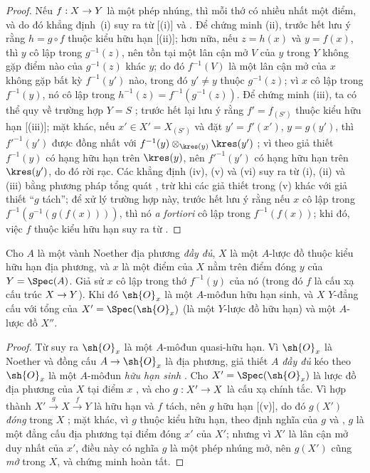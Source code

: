 \documentclass[oneside,10pt]{amsart}
\makeatletter
\newcommand{\ega@arrow}[2]{\mathchoice{#1}{#2}{#2}{#2}}
\renewcommand{\to}{\ega@arrow{\longrightarrow}{\rightarrow}}
\newcommand{\oldpage}[2][]{\marginnote{\normalfont\footnotesize\textbf{#1}~|~#2}\ignorespaces}
\let\EGAOriginalLabel\label
\renewcommand{\label}[1]{\phantomsection\EGAOriginalLabel{#1}}
\makeatother
\begin{document}
\begin{proof}
Nếu $f:X\to Y$ là một phép nhúng, thì mỗi thớ có nhiều nhất một điểm, và do đó khẳng định~(i) suy ra từ [(i)] và .
Để chứng minh (ii), trước hết lưu ý rằng $h=g\circ f$ thuộc kiểu hữu hạn [(ii)];
hơn nữa, nếu $z=h(x)$ và $y=f(x)$, thì $y$ cô lập trong $g^{-1}(z)$, nên tồn tại một lân cận mở $V$ của $y$ trong $Y$ không gặp điểm nào của $g^{-1}(z)$ khác $y$;
do đó $f^{-1}(V)$ là một lân cận mở của $x$ không gặp bất kỳ
\oldpage[II]{116}
$f^{-1}(y')$ nào, trong đó $y'\neq y$ thuộc $g^{-1}(z)$;
vì $x$ cô lập trong $f^{-1}(y)$, nó cô lập trong $h^{-1}(z)=f^{-1}(g^{-1}(z))$.
Để chứng minh (iii), ta có thể quy về trường hợp $Y=S$ ;
trước hết lại lưu ý rằng $f'=f_{(S')}$ thuộc kiểu hữu hạn [(iii)];
mặt khác, nếu $x'\in X'=X_{(S')}$ và đặt $y'=f'(x')$, $y=g(y')$, thì ${f'}^{-1}(y')$ được đồng nhất với $f^{-1}(y)\otimes_{\kres(y)}\kres(y')$ ;
vì theo giả thiết $f^{-1}(y)$ có hạng hữu hạn trên $\kres(y)$, nên ${f'}^{-1}(y')$ có hạng hữu hạn trên $\kres(y')$, do đó rời rạc.
Các khẳng định (iv), (v) và (vi) suy ra từ (i), (ii) và (iii) bằng phương pháp tổng quát , trừ khi các giả thiết trong (v) khác với giả thiết ``$g$ tách'';
để xử lý trường hợp này, trước hết lưu ý rằng nếu $x$ cô lập trong $f^{-1}(g^{-1}(g(f(x))))$, thì nó \emph{a fortiori} cô lập trong $f^{-1}(f(x))$;
khi đó, việc $f$ thuộc kiểu hữu hạn suy ra từ .
\end{proof}

\begin{proposition}[6.2.5]
\label{II.6.2.5}
Cho $A$ là một vành Noether địa phương \emph{đầy đủ}, $X$ là một $A$-lược đồ thuộc kiểu hữu hạn địa phương, và $x$ là một điểm của $X$ nằm trên điểm đóng $y$ của $Y=\Spec(A)$.
Giả sử $x$ cô lập trong thớ $f^{-1}(y)$ của nó (trong đó $f$ là cấu xạ cấu trúc $X\to Y$).
Khi đó $\sh{O}_x$ là một $A$-môđun hữu hạn sinh, và $X$ $Y$-đẳng cấu với tổng  của $X'=\Spec(\sh{O}_x)$ (là một $Y$-lược đồ hữu hạn) và một $A$-lược đồ $X''$.
\end{proposition}

\begin{proof}
Từ  suy ra $\sh{O}_x$ là một $A$-môđun quasi-hữu hạn.
Vì $\sh{O}_x$ là Noether  và đồng cấu $A\to\sh{O}_x$ là địa phương, giả thiết $A$ \emph{đầy đủ} kéo theo $\sh{O}_x$ là một $A$-môđun \emph{hữu hạn sinh} .
Cho $X'=\Spec(\sh{O}_x)$ là lược đồ địa phương của $X$ tại điểm $x$ , và cho $g:X'\to X$ là cấu xạ chính tắc.
Vì hợp thành $X'\xrightarrow{g}X\xrightarrow{f}Y$ là hữu hạn  và $f$ tách, nên $g$ hữu hạn [(v)], do đó $g(X')$ \emph{đóng} trong $X$ ;
mặt khác, vì $g$ thuộc kiểu hữu hạn, theo định nghĩa của $g$ và , $g$ là một đẳng cấu địa phương tại điểm đóng $x'$ của $X'$;
nhưng vì $X'$ là lân cận mở duy nhất của $x'$, điều này có nghĩa $g$ là một phép nhúng mở, nên $g(X')$ cũng \emph{mở} trong $X$, và chứng minh hoàn tất.
\end{proof}
\end{document}
